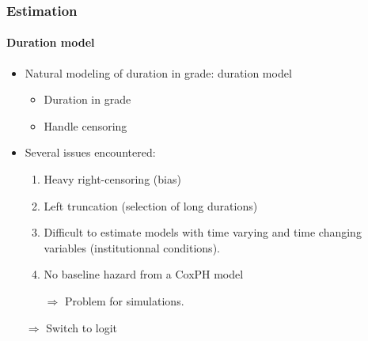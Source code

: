 \documentclass[xcolor=table,ignorenonframetext,12pt]{beamer}
\newenvironment{choixmarges}[2]{\begin{list}{}{%
\setlength{\topsep}{0pt}%
\setlength{\leftmargin}{0pt}%
\setlength{\rightmargin}{0pt}%
\setlength{\listparindent}{\parindent}%
\setlength{\itemindent}{\parindent}%
\setlength{\parsep}{0pt plus 1pt}%
\addtolength{\leftmargin}{#1}%
\addtolength{\rightmargin}{#2}%
}\item }{\end{list}}
\begin{document}
\begin{frame}
\frametitle{Estimation}
\framesubtitle{Duration model}
\begin{choixmarges}{-0.5cm}{-0.5cm}

\begin{itemize}
\item Natural modeling of duration in grade: duration model
	\begin{itemize}
	\item Duration in grade
	\item Handle censoring
	\end{itemize}

\vspace{0.2cm}
\item Several issues encountered: 

\begin{enumerate}
\item Heavy right-censoring (bias)
\item Left truncation (selection of long durations)
\item Difficult to estimate models with time varying and time changing variables (institutionnal conditions). 
\item No baseline hazard from a CoxPH model
\item[] $\Rightarrow$ Problem for simulations. 
\end{enumerate}


\vspace{0.2cm}
\item[$\Rightarrow$] Switch to logit 

\end{itemize}

\end{choixmarges}

\end{frame}
\end{document}
